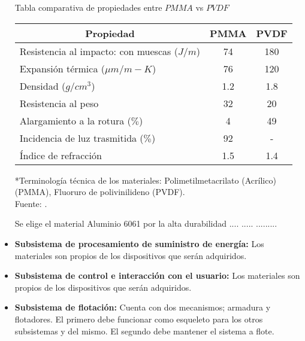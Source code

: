 \begin{itemize}
	\begin{mytable}[H]
		\centering
		\caption{Tabla comparativa de propiedades entre $PMMA$ vs $PVDF$}
		\label{tab:tabla comparativa de propiedades entre pmma vs pvdf}
		\begin{tabular}{|l|c|c|}
			\hline
			\multicolumn{1}{|c|}{\textbf{Propiedad}} & \multicolumn{1}{c|}{\textbf{PMMA}} & \textbf{PVDF} \\ \hline
			Resistencia al impacto: con muescas ($J/m$) & 74     & 180   \\ \hline
			Expansión térmica (${\mu}m/m-K$)  & 76 & 120 \\ \hline
			Densidad ($g/cm^3$) & 1.2 & 1.8  \\ \hline
			Resistencia al peso  & 32 & 20 \\ \hline
			Alargamiento a la rotura ($ \% $) & 4 & 49 \\ \hline
			Incidencia de luz trasmitida ($ \% $) & 92 & - \\ \hline
			Índice de refracción & 1.5 & 1.4 \\ \hline			
		\end{tabular}
		\begin{flushleft}
			*Terminología técnica de los materiales: Polimetilmetacrilato (Acrílico)(PMMA), Fluoruro de polivinilideno (PVDF).\\		
			Fuente: \cite{Brydson1999,Berins1991,Harper2000,MakeItFrom2020}.
		\end{flushleft}
	\end{mytable}

	Se elige el material Aluminio 6061 por la alta durabilidad .... ..... .........
	
	\item \textbf{Subsistema de procesamiento de suministro de energía:} Los materiales son propios de los dispositivos que serán adquiridos.
	
	\item \textbf{Subsistema de control e interacción con el usuario:} Los materiales son propios de los dispositivos que serán adquiridos.
	
	\item \textbf{Subsistema de flotación:} Cuenta con dos mecanismos; armadura y flotadores. El primero debe funcionar como esqueleto para los otros subsistemas y del mismo. El segundo debe mantener el sistema a flote.
	
\end{itemize}

